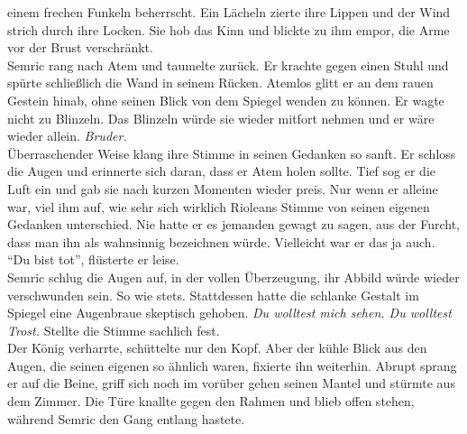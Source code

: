einem frechen 
Funkeln beherrscht. Ein Lächeln zierte ihre Lippen und der Wind strich durch 
ihre Locken. Sie hob 
das Kinn und blickte zu ihm empor, die Arme vor der Brust verschränkt. \\
Semric rang nach Atem und taumelte zurück. Er krachte gegen einen Stuhl und 
spürte schließlich die 
Wand in seinem Rücken. Atemlos glitt er an dem rauen Gestein hinab, ohne seinen 
Blick von dem 
Spiegel wenden zu können. Er wagte nicht zu Blinzeln. Das Blinzeln würde sie 
wieder mitfort nehmen 
und er wäre wieder allein. \textit{Bruder.}\\
Überraschender Weise klang ihre Stimme in seinen Gedanken so sanft. Er schloss 
die Augen und 
erinnerte sich daran, dass er Atem holen sollte. Tief sog er die Luft ein und 
gab sie nach kurzen 
Momenten wieder preis. Nur wenn er alleine war, viel ihm auf, wie sehr sich 
wirklich Rioleans 
Stimme von seinen eigenen Gedanken unterschied. Nie hatte er es jemanden gewagt 
zu sagen, aus der 
Furcht, dass man ihn als wahnsinnig bezeichnen würde. Vielleicht war er das ja 
auch.\\
``Du bist tot'', flüsterte er leise.\\
Semric schlug die Augen auf, in der vollen Überzeugung, ihr Abbild würde wieder 
verschwunden sein. 
So wie stets. Stattdessen hatte die schlanke Gestalt im Spiegel eine Augenbraue 
skeptisch gehoben. 
\textit{Du wolltest mich sehen. Du wolltest Trost.} Stellte die Stimme sachlich 
fest. \\
Der König verharrte, schüttelte nur den Kopf. Aber der kühle Blick aus den 
Augen, die seinen 
eigenen so ähnlich waren, fixierte ihn weiterhin. Abrupt sprang er auf die 
Beine, griff sich noch 
im vorüber gehen seinen Mantel und stürmte aus dem Zimmer. Die Türe knallte 
gegen den Rahmen und 
blieb offen stehen, während Semric den Gang entlang hastete.\\

